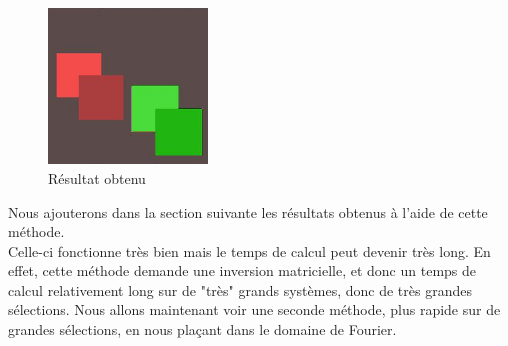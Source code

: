\begin{figure}[!h]
    \centering
\includegraphics[width = 120pt]{Images/result.png}
\caption{Résultat obtenu}\hfill
\end{figure} 
Nous ajouterons dans la section suivante les résultats obtenus à l'aide de cette méthode. \\ Celle-ci fonctionne très bien mais le temps de calcul peut devenir très long. En effet, cette méthode demande une inversion matricielle, et donc un temps de calcul relativement long sur de "très" grands systèmes, donc de très grandes sélections. Nous allons maintenant voir une seconde méthode, plus rapide sur de grandes sélections, en nous plaçant dans le domaine de Fourier.

